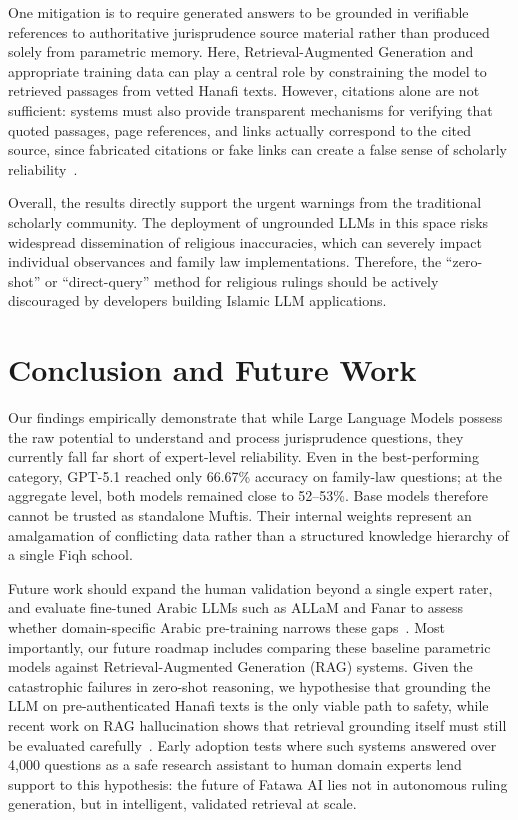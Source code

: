 \documentclass[runningheads]{llncs}
\begin{document}
One mitigation is to require generated answers to be grounded in verifiable references to authoritative jurisprudence source material rather than produced solely from parametric memory. Here, Retrieval-Augmented Generation and appropriate training data can play a central role by constraining the model to retrieved passages from vetted Hanafi texts. However, citations alone are not sufficient: systems must also provide transparent mechanisms for verifying that quoted passages, page references, and links actually correspond to the cited source, since fabricated citations or fake links can create a false sense of scholarly reliability~\cite{niu2023ragtruth,song2024rag}.

Overall, the results directly support the urgent warnings from the traditional scholarly community. The deployment of ungrounded LLMs in this space risks widespread dissemination of religious inaccuracies, which can severely impact individual observances and family law implementations. Therefore, the ``zero-shot'' or ``direct-query'' method for religious rulings should be actively discouraged by developers building Islamic LLM applications.

\section{Conclusion and Future Work}

Our findings empirically demonstrate that while Large Language Models possess the raw potential to understand and process jurisprudence questions, they currently fall far short of expert-level reliability. Even in the best-performing category, GPT-5.1 reached only 66.67\% accuracy on family-law questions; at the aggregate level, both models remained close to 52--53\%. Base models therefore cannot be trusted as standalone Muftis. Their internal weights represent an amalgamation of conflicting data rather than a structured knowledge hierarchy of a single Fiqh school.

Future work should expand the human validation beyond a single expert rater, and evaluate fine-tuned Arabic LLMs such as ALLaM and Fanar to assess whether domain-specific Arabic pre-training narrows these gaps~\cite{bari2024allam,team2025fanar}. Most importantly, our future roadmap includes comparing these baseline parametric models against Retrieval-Augmented Generation (RAG) systems. Given the catastrophic failures in zero-shot reasoning, we hypothesise that grounding the LLM on pre-authenticated Hanafi texts is the only viable path to safety, while recent work on RAG hallucination shows that retrieval grounding itself must still be evaluated carefully~\cite{niu2023ragtruth,song2024rag}. Early adoption tests where such systems answered over 4{,}000 questions as a safe research assistant to human domain experts lend support to this hypothesis: the future of Fatawa AI lies not in autonomous ruling generation, but in intelligent, validated retrieval at scale.
\end{document}
